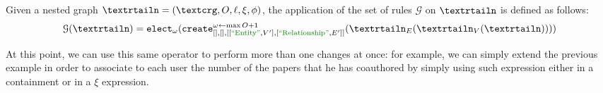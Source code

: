 \begin{definition}[continues=def:gggintro]
	 Given a nested graph $\nested=(\ngraph,O,\ell,\xi,\phi)$, the application of the set of rules $\mathcal{G}$ on $\nested$ is defined as follows:
\[\mathcal{G}(\nested)=\texttt{elect}_{\omega}(\texttt{create}_{[],[],[[\ONTA,V'],[\RELA,E']]}^{\omega\leftarrow\max O+1}(\nested_E(\nested_V(\nested))))\]
\end{definition}

At this point, we can use this same operator to perform more than one changes at once: for example, we can simply extend the previous example in order to associate to each user the number of the papers that he has coauthored by simply using such expression either in a containment or in a $\xi$ expression.



